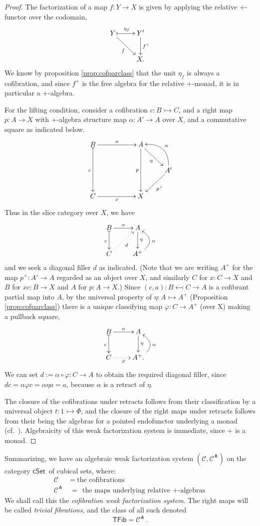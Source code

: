 \documentclass[11pt,reqno]{amsart}
\newcommand{\cSet}{\ensuremath{\mathsf{cSet}}}
\newcommand{\mono}{\ensuremath{\rightarrowtail}}
\newcommand{\ra}{\ensuremath{\rightarrow}}
\newcommand{\cof}{\ensuremath{\rightarrowtail}}
\renewcommand{\to}{\ensuremath{\rightarrow}}
\theoremstyle{remark}
\theoremstyle{definition}
\begin{document}
\begin{proof}
The factorization of a map $f : Y\ra X$ is given by applying the relative $+$-functor over the codomain,
\[
\xymatrix{
Y\ar[rd]_{f} \ar@{>->}[r]^{\eta_f} & Y' \ar[d]^-{f^{+}} \\
& X. 
}
\]
We know by proposition \ref{prop:cofparclass} that the unit $\eta_f$ is always a cofibration, and since $f^{+}$ is the free algebra for the relative $+$-monad, it is in particular a $+$-algebra.

For the lifting condition, consider a cofibration $c : B\mono C$, and a right map $p:A\ra X$ with $+$-algebra structure map $\alpha: A' \ra A$ over $X$, and a commutative square as indicated below.
\[
\xymatrix{
B \ar@{>->}[dd]_{c} \ar[rr]^{a}  && A \ar[dd]_p \ar[rd]_{\eta} & \\
 &&& A' \ar@/_4ex/ [lu]_\alpha  \ar[ld]^{p^+} \\
C \ar[rr]_{x} && X &
}
\]
Thus in the slice category over $X$, we have
\[
\xymatrix{
B\ar@{>->}[d]_{c} \ar[r]^{a} & A \ar[d]^-{\eta} \\
C \ar@{.>}[ru]_{d} & A^+ \ar@/_4ex/ [u]_\alpha
}
\]
and we seek a diagonal filler $d$ as indicated.  (Note that we are writing $A^+$ for the map $p^+ : A'\to A$ regarded as an object over $X$, and similarly $C$ for $x : C\to X$ and $B$ for $xc : B\to X$ and $A$ for $p:A\to X$.)
Since $(c,a) : B \leftarrowtail C \ra A$ is a cofibrant partial map into $A$, by the universal property of $\eta : A \cof A^+$ (Proposition \ref{prop:cofparclass}) there is a unique classifying map $\varphi : C \ra A^+$ (over X) making a pullback square,
\[
\xymatrix{
B\ar@{>->}[d]_{c} \ar[r]^{a} & A \ar[d]^-{\eta} \\
C \ar@{.>}[r]_{\varphi} & A^+. \ar@/_4ex/ [u]_\alpha
}
\]
We can set $d := \alpha\circ \varphi : C \ra A$ to obtain the required diagonal filler, since $dc = \alpha\varphi{c} = \alpha\eta{a} = a$, because $\alpha$ is a retract of $\eta$.

The closure of the cofibrations under retracts follows from their classification by a universal object $t : 1 \cof \Phi$, and the closure of the right maps under retracts follows from their being the algebras for a pointed endofunctor underlying a monad (cf.~\cite{Riehl}).  Algebraicity of this weak factorization system is immediate, since $+$ is a monad.
\end{proof}

Summarizing, we have an algebraic weak factorization system $(\mathcal{C}, \mathcal{C}^\pitchfork)$ on the category \cSet\ of cubical sets, where:
\begin{align*}
\mathcal{C}\ &=\ \text{the cofibrations}\\
\mathcal{C}^\pitchfork\ &=\  \text{the maps underlying relative $+$-algebras}
\end{align*}
We shall call this the \emph{cofibration weak factorization system}. 
The right maps will be called \emph{trivial fibrations}, and the class of all such denoted
\[
\mathsf{TFib} = \mathcal{C}^\pitchfork\,.
\]
\end{document}
